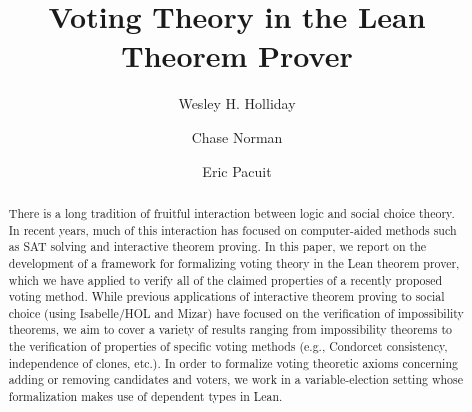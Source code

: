 \documentclass[runningheads]{llncs}
\begin{document}
%
\title{Voting Theory in the Lean Theorem Prover}

%
%
\author{Wesley H. Holliday \and
Chase Norman \and
Eric Pacuit}
%
%
%
\maketitle              %
%
\begin{abstract}
There is a long tradition of fruitful interaction between logic and social choice theory. In recent years, much of this interaction has focused on computer-aided methods such as SAT solving and interactive theorem proving. In this paper, we report on the development of a framework for formalizing voting theory in the Lean theorem prover, which we have applied to verify all of the claimed properties of a recently proposed voting method. While previous  applications of interactive theorem proving to social choice (using Isabelle/HOL and Mizar) have focused on the verification of impossibility theorems, we aim to cover a variety of results ranging from impossibility theorems to the verification of properties of specific voting methods (e.g., Condorcet consistency, independence of clones, etc.). In order to formalize voting theoretic axioms concerning adding or removing candidates and voters, we work in a variable-election setting whose formalization makes use of dependent types in Lean.



\end{abstract}
%
%
%
\end{document}
